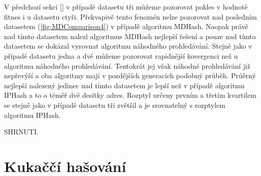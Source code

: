 V předchozí sekci [] v případě datasetu tři můžeme pozorovat pokles v hodnotě fitnes i u datasetu ctyři. Překvapivě
tento fenomén nelze pozorovat nad posledním datasetem (\ref{fig:MDComparison4}) v případě algoritmu MDHash. Naopak právě nad tímto datasetem
nalezl algoritmus MDHash nejlepší řešení a pouze nad tímto datasetem se dokázal vyrovnat algoritmu náhodného prohledávání.
Stejně jako v případě datasetu jedna a dvě můžeme pozorovat rapidnější kovergenci než u algoritmu náhodného prohledávání.
Tentokrát jej však náhodné prohledávání již nepřevýší a oba algoritmy mají v pozdějších generacích podobný průběh. Průěrný 
nejlepší nalezený jedinec nad tímto datasetem je lepší než v případě algoritmu IPHash a to o téměř dvě desítky adres. Rozptyl
určeny prvním a třetím kvartilem se stejně jako v případě datasetu tři zvětšil a je srovnatelný s rozptylem algoritmu IPHash.

SHRNUTI.

\newpage
\section{Kukaččí hašování}

